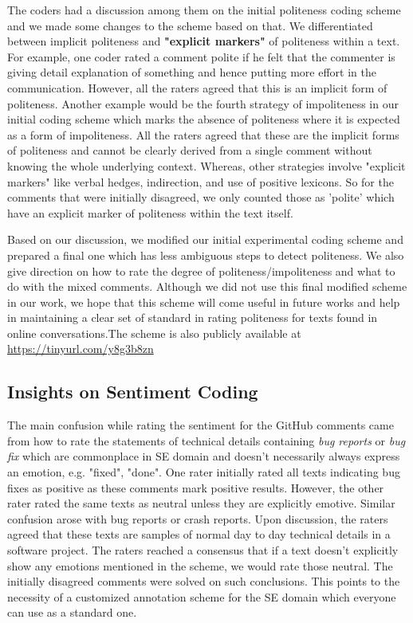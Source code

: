The coders had a discussion among them on the initial politeness coding scheme and we made some changes to the scheme based on that. We differentiated between implicit politeness and \textbf{"explicit markers"} of politeness within a text. For example, one coder rated a comment polite if he felt that the commenter is giving detail explanation of something and hence putting more effort in the communication. However, all the raters agreed that this is an implicit form of politeness. Another example would be the fourth strategy of impoliteness in our initial coding scheme which marks the absence of politeness where it is expected as a form of impoliteness. All the raters agreed that these are the implicit forms of politeness and cannot be clearly derived from a single comment without knowing the whole underlying context. Whereas, other strategies involve "explicit markers" like verbal hedges, indirection, and use of positive lexicons. So for the comments that were initially disagreed, we only counted those as 'polite' which have an explicit marker of politeness within the text itself.

Based on our discussion, we modified our initial experimental coding scheme and prepared a final one which has less ambiguous steps to detect politeness. We also give direction on how to rate the degree of politeness/impoliteness and what to do with the mixed comments. Although we did not use this final modified scheme in our work, we hope that this scheme will come useful in future works and help in maintaining a clear set of standard in rating politeness for texts found in online conversations.The scheme is also publicly available at \href{https://tinyurl.com/y8g3b8zn}{https://tinyurl.com/y8g3b8zn}

\subsection{Insights on Sentiment Coding}\label{sentschemedis}
The main confusion while rating the sentiment for the GitHub comments came from how to rate the statements of technical details containing \textit{bug reports} or \textit{bug fix} which are commonplace in SE domain and doesn't necessarily always express an emotion, e.g. "fixed", "done". One rater initially rated all texts indicating bug fixes as positive as these comments mark positive results. However, the other rater rated the same texts as neutral unless they are explicitly emotive. Similar confusion arose with bug reports or crash reports. Upon discussion, the raters agreed that these texts are samples of normal day to day technical details in a software project. The raters reached a consensus that if a text doesn't explicitly show any emotions mentioned in the scheme, we would rate those neutral. The initially disagreed comments were solved on such conclusions. This points to the necessity of a customized annotation scheme for the SE domain which everyone can use as a standard one. 

